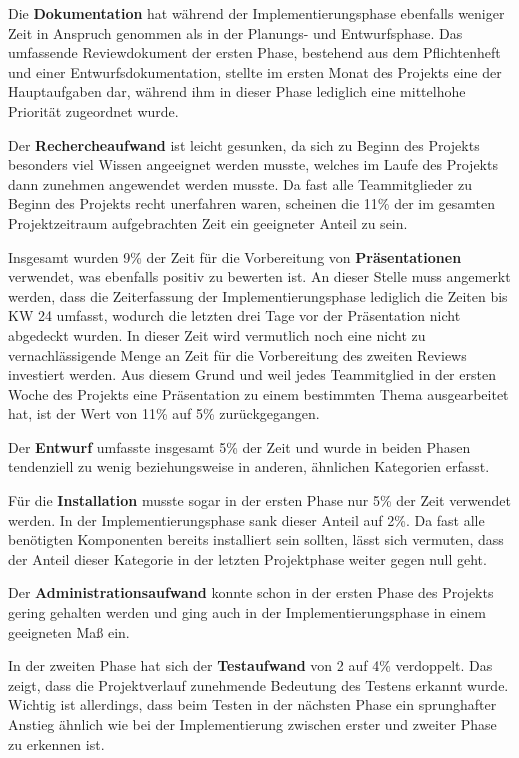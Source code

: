 \documentclass[../review_3.tex]{subfiles}
\begin{document}
Die \textbf{Dokumentation} hat während der Implementierungsphase ebenfalls weniger Zeit in Anspruch genommen als in der Planungs- und Entwurfsphase. Das umfassende Reviewdokument der ersten Phase, bestehend aus dem Pflichtenheft und einer Entwurfsdokumentation, stellte im ersten Monat des Projekts eine der Hauptaufgaben dar, während ihm in dieser Phase lediglich eine mittelhohe Priorität zugeordnet wurde.

Der \textbf{Rechercheaufwand} ist leicht gesunken, da sich zu Beginn des Projekts besonders viel Wissen angeeignet werden musste, welches im Laufe des Projekts dann zunehmen angewendet werden musste. Da fast alle Teammitglieder zu Beginn des Projekts recht unerfahren waren, scheinen die 11\% der im gesamten Projektzeitraum aufgebrachten Zeit ein geeigneter Anteil zu sein.

Insgesamt wurden 9\% der Zeit für die Vorbereitung von \textbf{Präsentationen} verwendet, was ebenfalls positiv zu bewerten ist. An dieser Stelle muss angemerkt werden, dass die Zeiterfassung der Implementierungsphase lediglich die Zeiten bis KW 24 umfasst, wodurch die letzten drei Tage vor der Präsentation nicht abgedeckt wurden. In dieser Zeit wird vermutlich noch eine nicht zu vernachlässigende Menge an Zeit für die Vorbereitung des zweiten Reviews investiert werden. Aus diesem Grund und weil jedes Teammitglied in der ersten Woche des Projekts eine Präsentation zu einem bestimmten Thema ausgearbeitet hat, ist der Wert von 11\% auf 5\% zurückgegangen.

Der \textbf{Entwurf} umfasste insgesamt 5\% der Zeit und wurde in beiden Phasen tendenziell zu wenig beziehungsweise in anderen, ähnlichen Kategorien erfasst.

Für die \textbf{Installation} musste sogar in der ersten Phase nur 5\% der Zeit verwendet werden. In der Implementierungsphase sank dieser Anteil auf 2\%. Da fast alle benötigten Komponenten bereits installiert sein sollten, lässt sich vermuten, dass der Anteil dieser Kategorie in der letzten Projektphase weiter gegen null geht.

Der \textbf{Administrationsaufwand} konnte schon in der ersten Phase des Projekts gering gehalten werden und ging auch in der Implementierungsphase in einem geeigneten Maß ein.

In der zweiten Phase hat sich der \textbf{Testaufwand} von 2 auf 4\% verdoppelt. Das zeigt, dass die Projektverlauf zunehmende Bedeutung des Testens erkannt wurde. Wichtig ist allerdings, dass beim Testen in der nächsten Phase ein sprunghafter Anstieg ähnlich wie bei der Implementierung zwischen erster und zweiter Phase zu erkennen ist.
\end{document}
